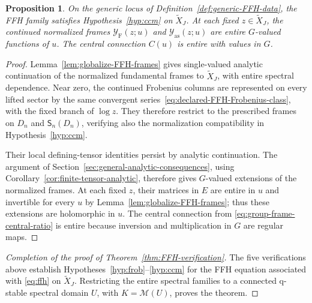 \documentclass[11pt,leqno]{amsart}
\numberwithin{equation}{section}
\theoremstyle{plain}
\newtheorem{proposition}[theorem]{Proposition}
\theoremstyle{definition}
\theoremstyle{plain}
\theoremstyle{definition}
\theoremstyle{remark}
\begin{document}
\begin{proposition}\label{prop:tensorial-FFH-frames}\label{prop:FFH-central-existence}
On the generic locus of Definition~\ref{def:generic-FFH-data}, the FFH family satisfies Hypothesis~\ref{hyp:ccm} on $\widetilde X_J$.  At each fixed $z\in\widetilde X_J$, the continued normalized frames $\mathcal Y_{\mathrm F}(z;u)$ and $\mathcal Y_{\mathrm{as}}(z;u)$ are entire $G$-valued functions of $u$.  The central connection $C(u)$ is entire with values in $G$.
\end{proposition}
\begin{proof}
Lemma~\ref{lem:globalize-FFH-frames} gives single-valued analytic continuation of the normalized fundamental frames to $\widetilde X_J$, with entire spectral dependence. Near zero, the continued Frobenius columns are represented on every lifted sector by the same convergent series~\eqref{eq:declared-FFH-Frobenius-class}, with the fixed branch of $\log z$. They therefore restrict to the prescribed frames on $D_n$ and $\mathsf S_n(D_n)$, verifying also the normalization compatibility in Hypothesis~\ref{hyp:ccm}.

Their local defining-tensor identities persist by analytic continuation.  The argument of Section~\ref{sec:general-analytic-consequences}, using Corollary~\ref{cor:finite-tensor-analytic}, therefore gives $G$-valued extensions of the normalized frames.  At each fixed $z$, their matrices in $E$ are entire in $u$ and invertible for every $u$ by Lemma~\ref{lem:globalize-FFH-frames}; thus these extensions are holomorphic in $u$.  The central connection from \eqref{eq:group-frame-central-ratio} is entire because inversion and multiplication in $G$ are regular maps.
\end{proof}

\begin{proof}[Completion of the proof of Theorem~\ref{thm:FFH-verification}]
The five verifications above establish Hypotheses~\ref{hyp:frob}--\ref{hyp:ccm} for the FFH equation associated with \eqref{eq:ffh} on $\widetilde X_J$.  Restricting the entire spectral families to a connected q-stable spectral domain $U$, with $K=\mathcal M(U)$, proves the theorem.
\end{proof}
\end{document}
